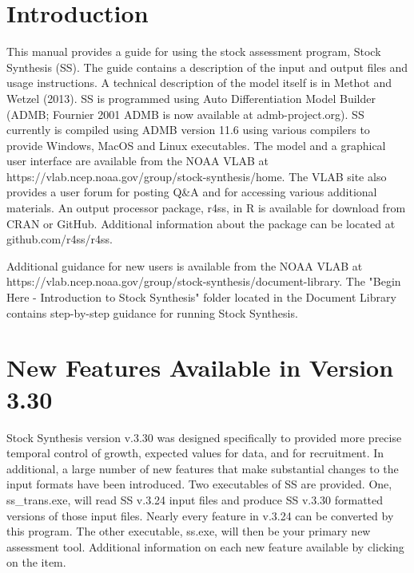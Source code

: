 
\section{Introduction}\label{sec:intro}
\begin{sloppypar}
This manual provides a guide for using the stock assessment program, Stock Synthesis (SS). The guide contains a description of the input and output files and usage instructions. A technical description of the model itself is in Methot and Wetzel (2013). SS is programmed using Auto Differentiation Model Builder (ADMB; Fournier 2001 ADMB is now available at admb-project.org). SS currently is compiled using ADMB version 11.6 using various compilers to provide Windows, MacOS and Linux executables. The model and a graphical user interface are available from the NOAA VLAB at https://vlab.ncep.noaa.gov/group/stock-synthesis/home. The VLAB site also provides a user forum for posting Q\&A and for accessing various additional materials.  An output processor package, r4ss, in R is available for download from CRAN or GitHub. Additional information about the package can be located at github.com/r4ss/r4ss.

Additional guidance for new users is available from the NOAA VLAB at https://vlab.ncep.noaa.gov/group/stock-synthesis/document-library.  The "Begin Here - Introduction to Stock Synthesis" folder located in the Document Library contains step-by-step guidance for running Stock Synthesis.  
\end{sloppypar}
	
\section{New Features Available in Version 3.30}
Stock Synthesis version v.3.30 was designed specifically to provided more precise temporal control of growth, expected values for data, and for recruitment.  In additional, a large number of new features that make substantial changes to the input formats have been introduced.  Two executables of SS are provided.  One, ss\_trans.exe, will read SS v.3.24 input files and produce SS v.3.30 formatted versions of those input files.  Nearly every feature in v.3.24 can be converted by this program.  The other executable, ss.exe, will then be your primary new assessment tool. Additional information on each new feature available by clicking on the item.
		
